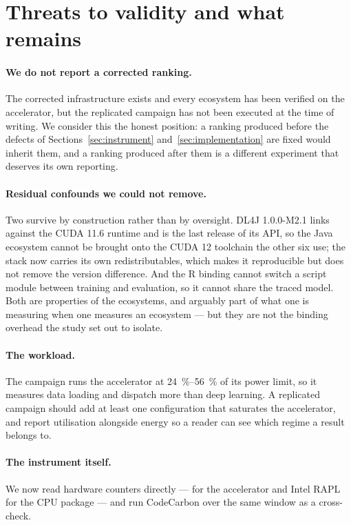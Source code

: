 \section{Threats to validity and what remains}
\label{sec:threats}

\paragraph{We do not report a corrected ranking.}
The corrected infrastructure exists and every ecosystem has been verified on the
accelerator, but the replicated campaign has not been executed at the time of
writing. We consider this the honest position: a ranking produced before the
defects of Sections~\ref{sec:instrument} and~\ref{sec:implementation} are fixed
would inherit them, and a ranking produced after them is a different experiment
that deserves its own reporting.

\paragraph{Residual confounds we could not remove.}
Two survive by construction rather than by oversight. DL4J 1.0.0-M2.1 links
against the CUDA 11.6 runtime and is the last release of its API, so the Java
ecosystem cannot be brought onto the CUDA 12 toolchain the other six use; the
stack now carries its own redistributables, which makes it reproducible but does
not remove the version difference. And the R binding cannot switch a script
module between training and evaluation, so it cannot share the traced model.
Both are properties of the ecosystems, and arguably part of what one is measuring
when one measures an ecosystem --- but they are not the binding overhead the
study set out to isolate.

\paragraph{The workload.}
The campaign runs the accelerator at \SIrange{24}{56}{\percent} of its power
limit, so it measures data loading and dispatch more than deep learning. A
replicated campaign should add at least one configuration that saturates the
accelerator, and report utilisation alongside energy so a reader can see which
regime a result belongs to.

\paragraph{The instrument itself.}
We now read hardware counters directly ---
 for the accelerator and Intel RAPL for
the CPU package --- and run CodeCarbon over the same window as a cross-check.

